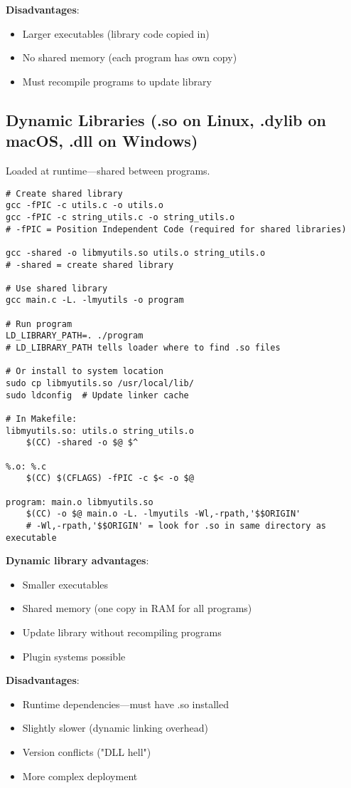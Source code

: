 \textbf{Disadvantages}:
\begin{itemize}
    \item Larger executables (library code copied in)
    \item No shared memory (each program has own copy)
    \item Must recompile programs to update library
\end{itemize}

\subsection{Dynamic Libraries (.so on Linux, .dylib on macOS, .dll on Windows)}

Loaded at runtime—shared between programs.

\begin{lstlisting}
# Create shared library
gcc -fPIC -c utils.c -o utils.o
gcc -fPIC -c string_utils.c -o string_utils.o
# -fPIC = Position Independent Code (required for shared libraries)

gcc -shared -o libmyutils.so utils.o string_utils.o
# -shared = create shared library

# Use shared library
gcc main.c -L. -lmyutils -o program

# Run program
LD_LIBRARY_PATH=. ./program
# LD_LIBRARY_PATH tells loader where to find .so files

# Or install to system location
sudo cp libmyutils.so /usr/local/lib/
sudo ldconfig  # Update linker cache

# In Makefile:
libmyutils.so: utils.o string_utils.o
	$(CC) -shared -o $@ $^

%.o: %.c
	$(CC) $(CFLAGS) -fPIC -c $< -o $@

program: main.o libmyutils.so
	$(CC) -o $@ main.o -L. -lmyutils -Wl,-rpath,'$$ORIGIN'
	# -Wl,-rpath,'$$ORIGIN' = look for .so in same directory as executable
\end{lstlisting}

\textbf{Dynamic library advantages}:
\begin{itemize}
    \item Smaller executables
    \item Shared memory (one copy in RAM for all programs)
    \item Update library without recompiling programs
    \item Plugin systems possible
\end{itemize}

\textbf{Disadvantages}:
\begin{itemize}
    \item Runtime dependencies—must have .so installed
    \item Slightly slower (dynamic linking overhead)
    \item Version conflicts ("DLL hell")
    \item More complex deployment
\end{itemize}

